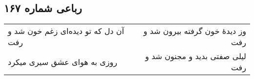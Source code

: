 \begin{center}
\section*{رباعی شماره ۱۶۷}
\label{sec:sh167}
\begin{longtable}{l p{0.5cm} r}
آن دل که تو دیده‌ای زغم خون شد و رفت
&&
وز دیدهٔ خون گرفته بیرون شد و رفت
\\
روزی به هوای عشق سیری میکرد
&&
لیلی صفتی بدید و مجنون شد و رفت
\\
\end{longtable}
\end{center}

